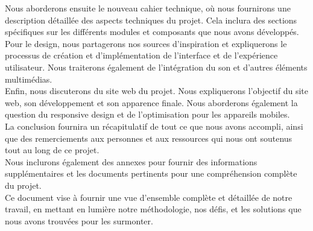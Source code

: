 Nous aborderons ensuite le nouveau cahier technique, où nous fournirons une description détaillée des aspects techniques du projet.
Cela inclura des sections spécifiques sur les différents modules et composants que nous avons développés.
\\

Pour le design, nous partagerons nos sources d'inspiration et expliquerons le processus de création et d'implémentation de l'interface et de l'expérience utilisateur.
Nous traiterons également de l'intégration du son et d'autres éléments multimédias.
\\

Enfin, nous discuterons du site web du projet.
Nous expliquerons l'objectif du site web, son développement et son apparence finale.
Nous aborderons également la question du responsive design et de l'optimisation pour les appareils mobiles.
\\

La conclusion fournira un récapitulatif de tout ce que nous avons accompli, ainsi que des remerciements aux personnes et aux ressources qui nous ont soutenus tout au long de ce projet.
\\

Nous inclurons également des annexes pour fournir des informations supplémentaires et les documents pertinents pour une compréhension complète du projet.
\\

Ce document vise à fournir une vue d'ensemble complète et détaillée de notre travail, en mettant en lumière notre méthodologie, nos défis, et les solutions que nous avons trouvées pour les surmonter.
